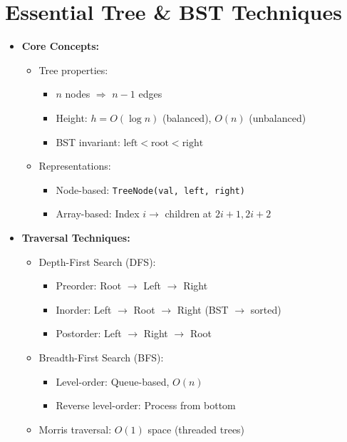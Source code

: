 \documentclass[a4paper,10pt]{book}
\begin{document}
\chapter{Essential Tree \& BST Techniques }
\label{sec:tree}
\begin{itemize}
    \item \textbf{Core Concepts:}
    \begin{itemize}
        \item Tree properties:
        \begin{itemize}
            \item $n$ nodes $\Rightarrow$ $n-1$ edges
            \item Height: $h = O(\log n)$ (balanced), $O(n)$ (unbalanced)
            \item BST invariant: $\text{left} < \text{root} < \text{right}$
        \end{itemize}
        \item Representations:
        \begin{itemize}
            \item Node-based: \texttt{TreeNode(val, left, right)}
            \item Array-based: Index $i \rightarrow$ children at $2i+1, 2i+2$
        \end{itemize}
    \end{itemize}
    
    \item \textbf{Traversal Techniques:}
    \begin{itemize}
        \item Depth-First Search (DFS):
        \begin{itemize}
            \item Preorder: Root $\rightarrow$ Left $\rightarrow$ Right
            \item Inorder: Left $\rightarrow$ Root $\rightarrow$ Right (BST $\rightarrow$ sorted)
            \item Postorder: Left $\rightarrow$ Right $\rightarrow$ Root
        \end{itemize}
        \item Breadth-First Search (BFS):
        \begin{itemize}
            \item Level-order: Queue-based, $O(n)$
            \item Reverse level-order: Process from bottom
        \end{itemize}
        \item Morris traversal: $O(1)$ space (threaded trees)
    \end{itemize}
    

\end{itemize}
\end{document}
